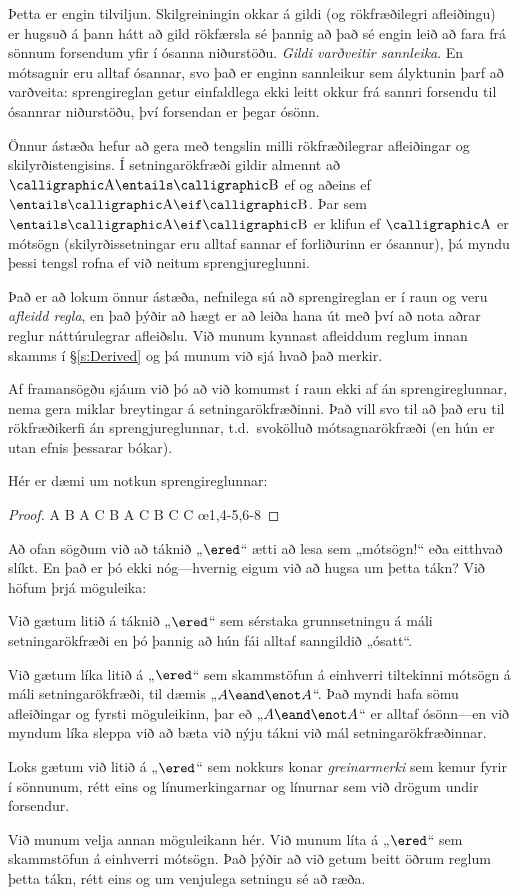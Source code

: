 Þetta er engin tilviljun. Skilgreiningin okkar á gildi (og rökfræðilegri afleiðingu) er hugsuð á þann hátt að gild rökfærsla sé þannig að það sé engin leið að fara frá sönnum forsendum yfir í ósanna niðurstöðu. \emph{Gildi varðveitir sannleika}. En mótsagnir eru alltaf ósannar, svo það er enginn sannleikur sem ályktunin þarf að varðveita: sprengireglan getur einfaldlega ekki leitt okkur frá sannri forsendu til ósannrar niðurstöðu, því forsendan er þegar ósönn.

Önnur ástæða hefur að gera með tengslin milli rökfræðilegrar afleiðingar og skilyrðistengisins. Í setningarökfræði gildir almennt að $\meta{A} \entails \meta{B}$ ef og aðeins ef $\entails \meta{A} \eif \meta{B}$. Þar sem $\entails \meta{A} \eif \meta{B}$ er klifun ef $\meta{A}$ er mótsögn (skilyrðissetningar eru alltaf sannar ef forliðurinn er ósannur), þá myndu þessi tengsl rofna ef við neitum sprengjureglunni.

Það er að lokum önnur ástæða, nefnilega sú að sprengireglan er í raun og veru \emph{afleidd regla}, en það þýðir að hægt er að leiða hana út með því að nota aðrar reglur náttúrulegrar afleiðslu. Við munum kynnast afleiddum reglum innan skamms í \S\ref{s:Derived} og þá munum við sjá hvað það merkir.

Af framansögðu sjáum við þó að við komumst í raun ekki af án sprengireglunnar, nema gera miklar breytingar á setningarökfræðinni. Það vill svo til að það eru til rökfræðikerfi án sprengjureglunnar, t.d.\ svokölluð mótsagnarökfræði (en hún er utan efnis þessarar bókar).

Hér er dæmi um notkun sprengireglunnar:
\begin{proof}
 {A \eor B}
 {A \eif C}
 {B \eif \bot}
\open
{} {A}
 {C} 
\close
\open
{} {B}
 {\bot} 
 {C} 
\close
{} {C} \oe{1,4-5,6-8}
\end{proof}

Að ofan sögðum við að táknið „$\ered$“ ætti að lesa sem „mótsögn!“ eða eitthvað slíkt. En það er þó ekki nóg---hvernig eigum við að hugsa um þetta tákn? Við höfum þrjá möguleika:

\begin{ebullet}
	\item Við gætum litið á táknið „$\ered$“ sem sérstaka grunnsetningu á máli setningarökfræði en þó þannig að hún fái alltaf sanngildið „ósatt“.
	\item Við gætum líka litið á „$\ered$“ sem skammstöfun á einhverri tiltekinni mótsögn á máli setningarökfræði, til dæmis „$A \eand \enot A$“. Það myndi hafa sömu afleiðingar og fyrsti möguleikinn, þar eð „$A \eand \enot A$“ er alltaf ósönn---en við myndum líka sleppa við að bæta við nýju tákni við mál setningarökfræðinnar.
	\item Loks gætum við litið á „$\ered$“ sem nokkurs konar \emph{greinarmerki} sem kemur fyrir í sönnunum, rétt eins og línumerkingarnar og línurnar sem við drögum undir forsendur.
\end{ebullet}Við munum velja annan möguleikann hér. Við munum líta á „$\ered$“ sem skammstöfun á einhverri mótsögn. Það þýðir að við getum beitt öðrum reglum þetta tákn, rétt eins og um venjulega setningu sé að ræða.


